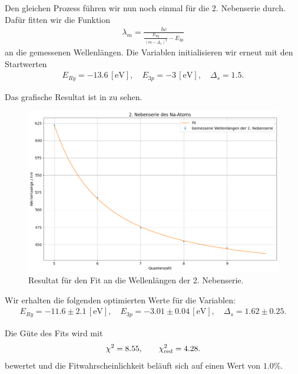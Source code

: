 Den gleichen Prozess führen wir nun noch einmal für die 2. Nebenserie durch. Dafür fitten wir die Funktion
\begin{align}
  \lambda_m = \frac{hc}{\frac{E_{Ry}}{(m - \Delta_s)^2} - E_{3p}}
\end{align}
an die gemessenen Wellenlängen. Die Variablen initialisieren wir erneut mit den Startwerten
\begin{align}
  E_{Ry} = -13.6\, [\si{\electronvolt}], \quad
  E_{3p} = -3\, [\si{\electronvolt}], \quad
  \Delta_s = 1.5.
\end{align}

Das grafische Resultat ist in  zu sehen.

\begin{figure}[H]
  \centering
  \includegraphics[width=.9\textwidth]{files/plots/na_2ns_fit.png}
  \caption{Resultat für den Fit an die Wellenlängen der 2. Nebenserie.}
  \label{fig:na_2ns_fit}
\end{figure}

Wir erhalten die folgenden optimierten Werte für die Variablen:
\begin{align}
  E_{Ry} = -11.6 \pm 2.1\, [\si{\electronvolt}], \quad
  E_{3p} = -3.01 \pm 0.04\, [\si{\electronvolt}], \quad
  \Delta_s = 1.62 \pm 0.25.
\end{align}

Die Güte des Fits wird mit
\begin{align}
  \chi^{2} = 8.55,\qquad \chi^{2}_{\mathrm{red}} = 4.28.
\end{align}
bewertet und die Fitwahrscheinlichkeit beläuft sich auf einen Wert von $1.0\%$.